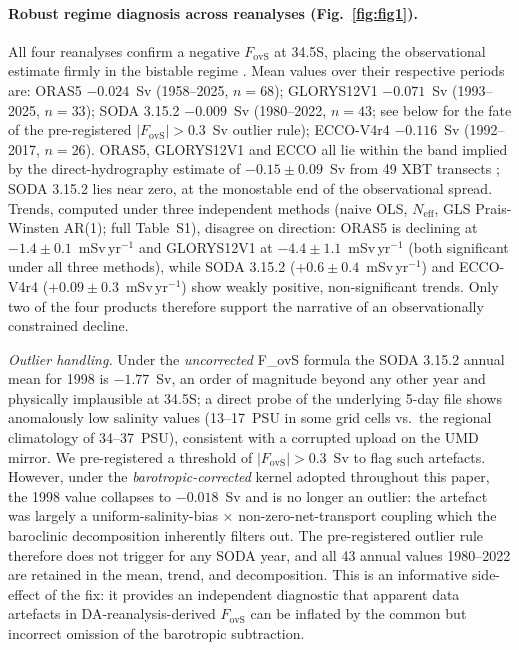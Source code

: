 \documentclass[12pt,a4paper]{article}
\newcommand{\Fovs}{F_\mathrm{ovS}}
\begin{document}
\paragraph{Robust regime diagnosis across reanalyses (Fig.~\ref{fig:fig1}).}
All four reanalyses confirm a negative $\Fovs$ at 34.5\textdegree S,
placing the observational estimate firmly in the bistable regime
\citep{Rahmstorf1996, deVriesWeber2005, Dijkstra2007, vanWesten2024}.
Mean values over their respective periods are:
ORAS5 ${-0.024}$~Sv (1958--2025, $n=68$);
GLORYS12V1 ${-0.071}$~Sv (1993--2025, $n=33$);
SODA 3.15.2 ${-0.009}$~Sv (1980--2022, $n=43$; see below for the
fate of the pre-registered $|\Fovs|>0.3$~Sv outlier rule);
ECCO-V4r4 ${-0.116}$~Sv (1992--2017, $n=26$). ORAS5, GLORYS12V1 and
ECCO all lie within the band implied by the direct-hydrography
estimate of ${-0.15\pm 0.09}$~Sv from 49 XBT transects
\citep{Dong2024}; SODA 3.15.2 lies near zero, at the monostable
end of the observational spread. Trends, computed under three
independent methods (naive OLS, \citet{Santer2000} $N_\mathrm{eff}$,
GLS Prais-Winsten AR(1); full Table~S1), disagree on direction:
ORAS5 is declining at ${-1.4\pm 0.1}$~mSv\,yr$^{-1}$ and GLORYS12V1 at
${-4.4\pm 1.1}$~mSv\,yr$^{-1}$ (both significant under all three
methods), while SODA 3.15.2 ($+0.6\pm 0.4$~mSv\,yr$^{-1}$) and
ECCO-V4r4 ($+0.09\pm 0.3$~mSv\,yr$^{-1}$) show weakly positive,
non-significant trends. Only two of the four products therefore
support the \citet{Portmann2026} narrative of an observationally
constrained decline.

\emph{Outlier handling.} Under the \emph{uncorrected} F_ovS formula
the SODA 3.15.2 annual mean for 1998 is $-1.77$~Sv, an order of
magnitude beyond any other year and physically implausible at
34.5\textdegree S; a direct probe of the underlying 5-day file
shows anomalously low salinity values (13--17~PSU in some grid cells
vs.\ the regional climatology of 34--37~PSU), consistent with a
corrupted upload on the UMD mirror. We pre-registered a threshold of
$|\Fovs| > 0.3$~Sv to flag such artefacts. However, under the
\emph{barotropic-corrected} kernel adopted throughout this paper,
the 1998 value collapses to $-0.018$~Sv and is no longer an
outlier: the artefact was largely a uniform-salinity-bias ×
non-zero-net-transport coupling which the baroclinic decomposition
inherently filters out. The pre-registered outlier rule therefore
does not trigger for any SODA year, and all 43 annual values
1980--2022 are retained in the mean, trend, and decomposition.
This is an informative side-effect of the fix: it provides an
independent diagnostic that apparent data artefacts in
DA-reanalysis-derived $\Fovs$ can be inflated by the common but
incorrect omission of the barotropic subtraction.
\end{document}
